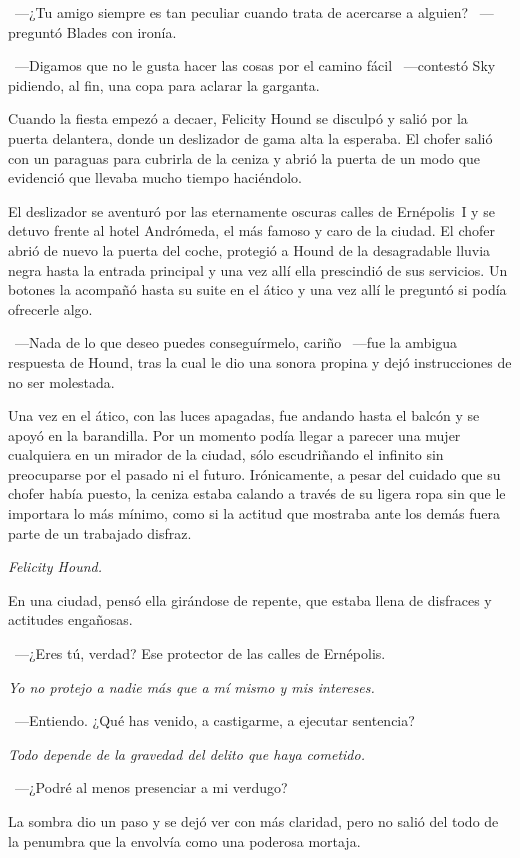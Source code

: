 ~---¿Tu amigo siempre es tan peculiar cuando trata de acercarse a alguien? ~---preguntó Blades con ironía.

~---Digamos que no le gusta hacer las cosas por el camino fácil ~---contestó Sky pidiendo, al fin, una copa para aclarar la garganta.

\bigskip\noindent
Cuando la fiesta empezó a decaer, Felicity Hound se disculpó y salió por la puerta delantera, donde un deslizador de gama alta la esperaba. El chofer salió con un paraguas para cubrirla de la ceniza y abrió la puerta de un modo que evidenció que llevaba mucho tiempo haciéndolo.

El deslizador se aventuró por las eternamente oscuras calles de Ernépolis~I y se detuvo frente al hotel Andrómeda, el más famoso y caro de la ciudad. El chofer abrió de nuevo la puerta del coche, protegió a Hound de la desagradable lluvia negra hasta la entrada principal y una vez allí ella prescindió de sus servicios.
Un botones la acompañó hasta su suite en el ático y una vez allí le preguntó si podía ofrecerle algo.

~---Nada de lo que deseo puedes conseguírmelo, cariño ~---fue la ambigua respuesta de Hound, tras la cual le dio una sonora propina y dejó instrucciones de no ser molestada.

Una vez en el ático, con las luces apagadas, fue andando hasta el balcón y se apoyó en la barandilla. Por un momento podía llegar a parecer una mujer cualquiera en un mirador de la ciudad, sólo escudriñando el infinito sin preocuparse por el pasado ni el futuro. Irónicamente, a pesar del cuidado que su chofer había puesto, la ceniza estaba calando a través de su ligera ropa sin que le importara lo más mínimo, como si la actitud que mostraba ante los demás fuera parte de un trabajado disfraz.

\emph{Felicity Hound.}

En una ciudad, pensó ella girándose de repente, que estaba llena de disfraces y actitudes engañosas.

~---¿Eres tú, verdad? Ese protector de las calles de Ernépolis.

\emph{Yo no protejo a nadie más que a mí mismo y mis intereses.}

~---Entiendo. ¿Qué has venido, a castigarme, a ejecutar sentencia?

\emph{Todo depende de la gravedad del delito que haya cometido.}

~---¿Podré al menos presenciar a mi verdugo?

La sombra dio un paso y se dejó ver con más claridad, pero no salió del todo de la penumbra que la envolvía como una poderosa mortaja.

